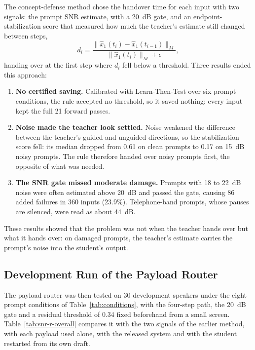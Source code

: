 The concept-defense method chose the handover time for each input with two signals: the prompt SNR estimate, with a 20~dB gate, and an endpoint-stabilization score that measured how much the teacher's estimate still changed between steps,
\[
d_i = \frac{\|\hat x_1(t_i) - \hat x_1(t_{i-1})\|_M}{\|\hat x_1(t_i)\|_M + \epsilon},
\]
handing over at the first step where $d_i$ fell below a threshold. Three results ended this approach:
\begin{enumerate}[leftmargin=1.4em]
\item \textbf{No certified saving.} Calibrated with Learn-Then-Test over six prompt conditions, the rule accepted no threshold, so it saved nothing: every input kept the full 21 forward passes.
\item \textbf{Noise made the teacher look settled.} Noise weakened the difference between the teacher's guided and unguided directions, so the stabilization score fell: its median dropped from 0.61 on clean prompts to 0.17 on 15~dB noisy prompts. The rule therefore handed over noisy prompts first, the opposite of what was needed.
\item \textbf{The SNR gate missed moderate damage.} Prompts with 18 to 22~dB noise were often estimated above 20~dB and passed the gate, causing 86 added failures in 360 inputs (23.9\%). Telephone-band prompts, whose pauses are silenced, were read as about 44~dB.
\end{enumerate}
These results showed that the problem was not when the teacher hands over but what it hands over: on damaged prompts, the teacher's estimate carries the prompt's noise into the student's output.

\subsection{Development Run of the Payload Router}
\label{app:snr-r}

The payload router was then tested on 30 development speakers under the eight prompt conditions of Table~\ref{tab:conditions}, with the four-step path, the 20~dB gate and a residual threshold of 0.34 fixed beforehand from a small screen. Table~\ref{tab:snr-r-overall} compares it with the two signals of the earlier method, with each payload used alone, with the released system and with the student restarted from its own draft.

